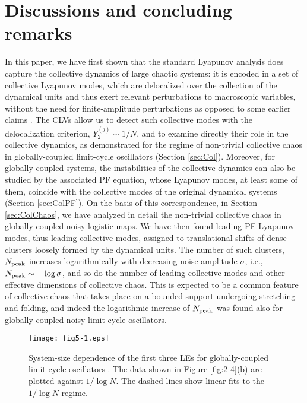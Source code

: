 \documentclass[12pt]{iopart}
\begin{document}
\section{Discussions and concluding remarks}  \label{sec:Dis}

In this paper, we have first shown that
 the standard Lyapunov analysis does capture
 the collective dynamics of large chaotic systems:
 it is encoded in a set of collective Lyapunov modes,
 which are delocalized over the collection of the dynamical units
 and thus exert relevant perturbations to macroscopic variables,
 without the need for finite-amplitude perturbations
 as opposed to some earlier claims
 \cite{Shibata.Kaneko-PRL1998,Cencini.etal-PD1999}.
The CLVs allow us to detect such collective modes
 with the delocalization criterion, $Y_2^{(j)} \sim 1/N$,
 and to examine directly their role in the collective dynamics,
 as demonstrated for the regime of non-trivial collective chaos
 in globally-coupled limit-cycle oscillators (Section \ref{sec:Col}).
Moreover, for globally-coupled systems,
 the instabilities of the collective dynamics can also be studied
 by the associated PF equation,
 whose Lyapunov modes, at least some of them, coincide
 with the collective modes of the original dynamical systems
 (Section \ref{sec:ColPF}).
On the basis of this correspondence,
 in Section \ref{sec:ColChaos},
 we have analyzed in detail the non-trivial collective chaos
 in globally-coupled noisy logistic maps.
We have then found leading PF Lyapunov modes,
 thus leading collective modes,
 assigned to translational shifts of dense clusters
 loosely formed by the dynamical units.
The number of such clusters, $N_{\rm peak}$ increases logarithmically
 with decreasing noise amplitude $\sigma$,
 i.e., $N_{\rm peak} \sim -\log\sigma$,
 and so do the number of leading collective modes
 and other effective dimensions of collective chaos.
This is expected to be a common feature of collective chaos
 that takes place on a bounded support undergoing stretching and folding,
 and indeed the logarithmic increase of $N_{\rm peak}$ was found
also for globally-coupled noisy limit-cycle oscillators.

\begin{figure}[t]
 \begin{center}
  \texttt{[image: fig5-1.eps]}
  \caption{System-size dependence of the first three LEs for globally-coupled limit-cycle oscillators . The data shown in Figure \ref{fig:2-4}(b) are plotted against $1/\log N$. The dashed lines show linear fits to the $1/\log N$ regime.}
  \label{fig:5-1}
 \end{center}
\end{figure}%
\end{document}
